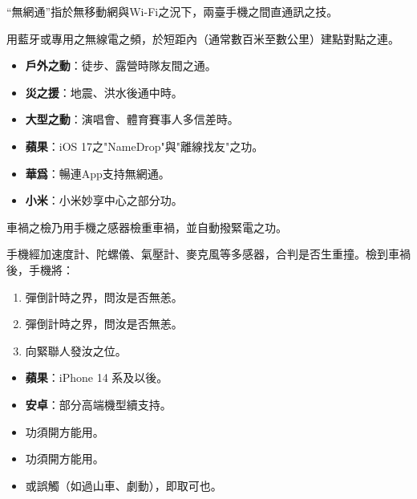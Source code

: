 
“無網通”指於無移動網與Wi-Fi之況下，兩臺手機之間直通訊之技。


用藍牙或專用之無線電之頻，於短距內（通常數百米至數公里）建點對點之連。


\begin{itemize}
  \item \textbf{戶外之動}：徒步、露營時隊友間之通。
  \item \textbf{災之援}：地震、洪水後通中時。
  \item \textbf{大型之動}：演唱會、體育賽事人多信差時。
\end{itemize}


\begin{itemize}
  \item \textbf{蘋果}：iOS 17之"NameDrop"與"離線找友"之功。
  \item \textbf{華爲}：暢連App支持無網通。
  \item \textbf{小米}：小米妙享中心之部分功。
\end{itemize}


車禍之檢乃用手機之感器檢重車禍，並自動撥緊電之功。


手機經加速度計、陀螺儀、氣壓計、麥克風等多感器，合判是否生重撞。檢到車禍後，手機將：

\begin{enumerate}
  \item 彈倒計時之界，問汝是否無恙。
  \item 彈倒計時之界，問汝是否無恙。
  \item 向緊聯人發汝之位。
\end{enumerate}


\begin{itemize}
  \item \textbf{蘋果}：iPhone 14 系及以後。
  \item \textbf{安卓}：部分高端機型續支持。
\end{itemize}


\begin{itemize}
  \item 功須開方能用。
  \item 功須開方能用。
  \item 或誤觸（如過山車、劇動），即取可也。
\end{itemize}

